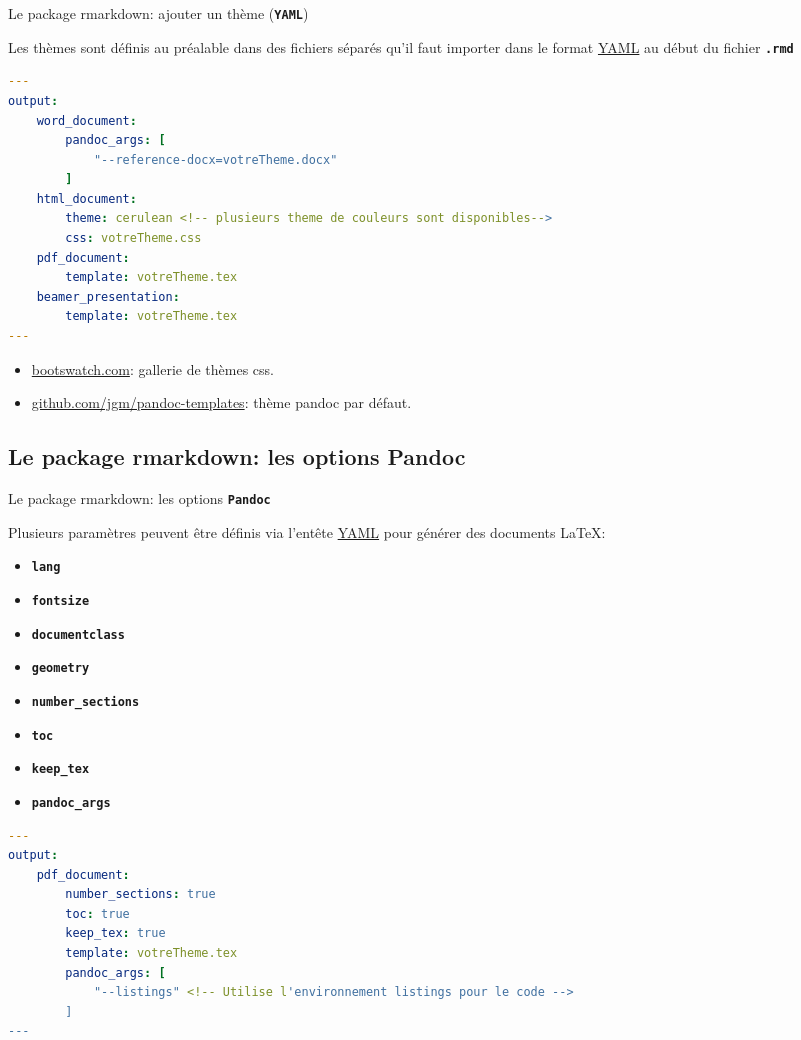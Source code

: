 \documentclass[10pt, xcolors={RGB}, hyperref={pdfpagelabels=false,
        colorlinks=true,
        linkcolor=black,
        urlcolor=black,
        citecolor=black,
        filecolor=black,
        menucolor=black,
        pdftex=true,
        bookmarks=true,
        bookmarksopen=true,
        hyperfootnotes=true}]{beamer}
\newcommand\cmdb[1]{\texttt{\color{dodgerblue}\textbf{#1}}}
\begin{document}
\begin{frame}[containsverbatim]{Le package rmarkdown: ajouter un thème (\cmdb{YAML})}
\par{Les thèmes sont définis au préalable dans des fichiers séparés qu'il faut importer dans le format \href{http://fr.wikipedia.org/wiki/YAML}{YAML} au début du fichier \cmdb{.rmd}}
\vspace{-2ex}
\begin{lstlisting}[language=yaml, lineskip=0ex]
---
output:
    word_document:
        pandoc_args: [
            "--reference-docx=votreTheme.docx"
        ]
    html_document:
        theme: cerulean <!-- plusieurs theme de couleurs sont disponibles-->
        css: votreTheme.css
    pdf_document:
        template: votreTheme.tex
    beamer_presentation:
        template: votreTheme.tex
---
\end{lstlisting}
\par{
\begin{itemize}
    \item \href{http://bootswatch.com/}{bootswatch.com}: gallerie de thèmes css.
    \item \href{https://github.com/jgm/pandoc-templates}{github.com/jgm/pandoc-templates}: thème pandoc par défaut.
\end{itemize}
}
\end{frame}


\subsection{Le package rmarkdown: les options Pandoc}
\begin{frame}[containsverbatim]{Le package rmarkdown: les options \cmdb{Pandoc}}
\par{Plusieurs paramètres peuvent être définis via l'entête \href{http://fr.wikipedia.org/wiki/YAML}{YAML} pour générer des documents \LaTeX:
\vspace{-2ex}
\begin{multicols}{2}
\begin{itemize}
    \item \cmdb{lang}
    \item \cmdb{fontsize}
    \item \cmdb{documentclass}
    \item \cmdb{geometry}
    \columnbreak
    \item \cmdb{number\_sections}
    \item \cmdb{toc}
    \item \cmdb{keep\_tex}
    \item \cmdb{pandoc\_args}
\end{itemize}
\end{multicols}
}
\vspace{-4ex}
\begin{lstlisting}[language=yaml, lineskip=0ex]
---
output:
    pdf_document:
        number_sections: true
        toc: true
        keep_tex: true
        template: votreTheme.tex
        pandoc_args: [
            "--listings" <!-- Utilise l'environnement listings pour le code -->
        ]
---
\end{lstlisting}
\end{frame}
\end{document}
